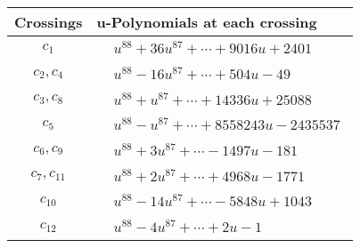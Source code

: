 \documentclass[1p]{elsarticle_modified}
\theoremstyle{definition}
\begin{document}
\begin{tabular}{m{50pt}|m{274pt}}
Crossings & \hspace{64pt}u-Polynomials at each crossing \\
\hline $$\begin{aligned}c_{1}\end{aligned}$$&$\begin{aligned}
&u^{88}+36 u^{87}+\cdots+9016 u+2401
\end{aligned}$\\
\hline $$\begin{aligned}c_{2},c_{4}\end{aligned}$$&$\begin{aligned}
&u^{88}-16 u^{87}+\cdots+504 u-49
\end{aligned}$\\
\hline $$\begin{aligned}c_{3},c_{8}\end{aligned}$$&$\begin{aligned}
&u^{88}+u^{87}+\cdots+14336 u+25088
\end{aligned}$\\
\hline $$\begin{aligned}c_{5}\end{aligned}$$&$\begin{aligned}
&u^{88}- u^{87}+\cdots+8558243 u-2435537
\end{aligned}$\\
\hline $$\begin{aligned}c_{6},c_{9}\end{aligned}$$&$\begin{aligned}
&u^{88}+3 u^{87}+\cdots-1497 u-181
\end{aligned}$\\
\hline $$\begin{aligned}c_{7},c_{11}\end{aligned}$$&$\begin{aligned}
&u^{88}+2 u^{87}+\cdots+4968 u-1771
\end{aligned}$\\
\hline $$\begin{aligned}c_{10}\end{aligned}$$&$\begin{aligned}
&u^{88}-14 u^{87}+\cdots-5848 u+1043
\end{aligned}$\\
\hline $$\begin{aligned}c_{12}\end{aligned}$$&$\begin{aligned}
&u^{88}-4 u^{87}+\cdots+2 u-1
\end{aligned}$\\
\hline
\end{tabular}\\~\\
\end{document}
